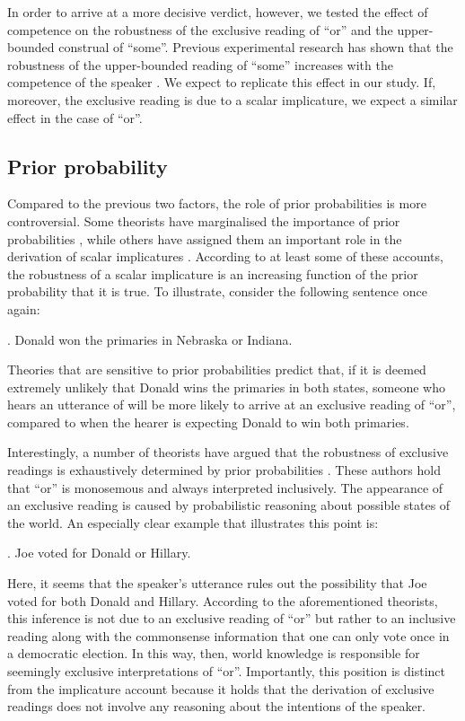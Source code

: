 \documentclass[12pt]{article}
\begin{document}
In order to arrive at a more decisive verdict, however, we tested the effect of competence on the robustness of the exclusive reading of ``or'' and the upper-bounded construal of ``some''. Previous experimental research has shown that the robustness of the upper-bounded reading of ``some'' increases with the competence of the speaker \citep{goodman2013}. We expect to replicate this effect in our study. If, moreover, the exclusive reading is due to a scalar implicature, we expect a similar effect in the case of ``or''.

\subsection*{Prior probability}

Compared to the previous two factors, the role of prior probabilities is more
controversial. Some theorists have marginalised the importance of prior probabilities
\citep{geurts2010}, while others have assigned them an important role in the derivation of
scalar implicatures \citep[e.g.,][]{frank2012,
  FrankeJager2015:Probabilistic-p,Russell2012:Probabilistic-R}. According to at least some of these accounts, the
robustness of a scalar implicature is an increasing function of the prior probability that it
is true. To illustrate, consider the following sentence once again:

\ex.	Donald won the primaries in Nebraska or Indiana.

Theories that are sensitive to prior probabilities predict that, if it is deemed extremely unlikely that Donald wins the primaries in both states, someone who hears an utterance of \Last will be more likely to arrive at an exclusive reading of ``or'', compared to when the hearer is expecting Donald to win both primaries.

Interestingly, a number of theorists have argued that the robustness of exclusive readings is exhaustively determined by prior probabilities \citep[e.g.,][]{rubin1989, yanal1988}. These authors hold that ``or'' is monosemous and always interpreted inclusively. The appearance of an exclusive reading is caused by probabilistic reasoning about possible states of the world. An especially clear example that illustrates this point is:

\ex.	Joe voted for Donald or Hillary.

Here, it seems that the speaker's utterance rules out the possibility that Joe voted for both Donald and Hillary. According to the aforementioned theorists, this inference is not due to an exclusive reading of ``or'' but rather to an inclusive reading along with the commonsense information that one can only vote once in a democratic election. In this way, then, world knowledge is responsible for seemingly exclusive interpretations of ``or''. Importantly, this position is distinct from the implicature account because it holds that the derivation of exclusive readings does not involve any reasoning about the intentions of the speaker.
\end{document}
